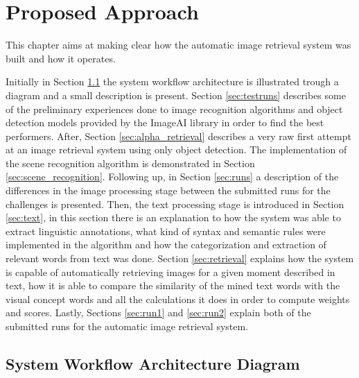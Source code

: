 \cleardoublepage

\chapter{Proposed Approach}
\label{ch:initial_work}

This chapter aims at making clear how the automatic image retrieval system was built and how it operates.



Initially in Section \ref{sec:diagram} the system workflow architecture is illustrated trough a diagram and a small description is present. Section \ref{sec:testruns} describes some of the preliminary experiences done to image recognition algorithms and object detection models provided by the ImageAI library in order to find the best performers. After, Section \ref{sec:alpha_retrieval} describes a very raw first attempt at an image retrieval system using only object detection. The implementation of the scene recognition algorithm is demonstrated in Section \ref{sec:scene_recognition}. Following up, in Section \ref{sec:runs} a description of the differences in the image processing stage between the submitted runs for the challenges is presented. Then, the text processing stage is introduced in Section \ref{sec:text}, in this section there is an explanation to how the system was able to extract linguistic annotations, what kind of syntax and semantic rules were implemented in the algorithm and how the categorization and extraction of relevant words from text was done. Section \ref{sec:retrieval} explains how the system is capable of automatically retrieving images for a given moment described in text, how it is able to compare the similarity of the mined text words with the visual concept words and all the calculations it does in order to compute weights and scores. Lastly, Sections \ref{sec:run1} and \ref{sec:run2} explain both of the submitted runs for the automatic image retrieval system.



\section{System Workflow Architecture Diagram}
\label{sec:diagram}
   
